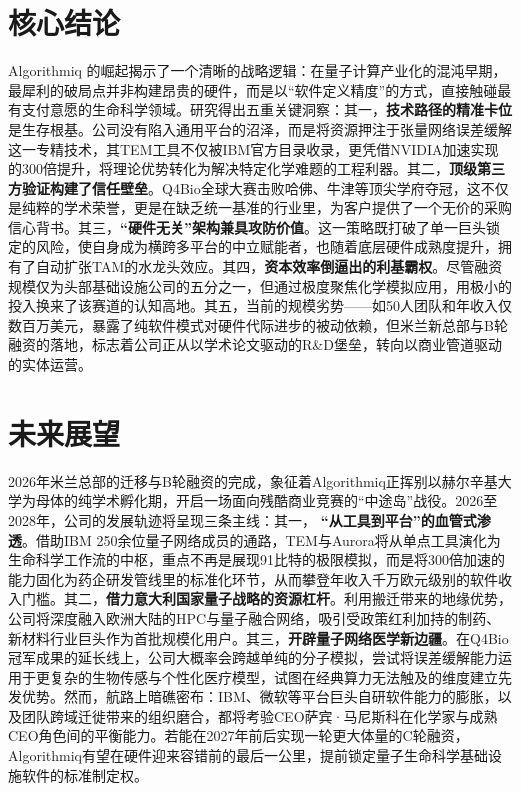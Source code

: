 \documentclass[11pt,a4paper]{ctexart}
\begin{document}
\section{核心结论}
Algorithmiq 的崛起揭示了一个清晰的战略逻辑：在量子计算产业化的混沌早期，最犀利的破局点并非构建昂贵的硬件，而是以“软件定义精度”的方式，直接触碰最有支付意愿的生命科学领域。研究得出五重关键洞察：其一，\textbf{技术路径的精准卡位}是生存根基。公司没有陷入通用平台的沼泽，而是将资源押注于张量网络误差缓解这一专精技术，其TEM工具不仅被IBM官方目录收录，更凭借NVIDIA加速实现的300倍提升，将理论优势转化为解决特定化学难题的工程利器。其二，\textbf{顶级第三方验证构建了信任壁垒}。Q4Bio全球大赛击败哈佛、牛津等顶尖学府夺冠，这不仅是纯粹的学术荣誉，更是在缺乏统一基准的行业里，为客户提供了一个无价的采购信心背书。其三，\textbf{“硬件无关”架构兼具攻防价值}。这一策略既打破了单一巨头锁定的风险，使自身成为横跨多平台的中立赋能者，也随着底层硬件成熟度提升，拥有了自动扩张TAM的水龙头效应。其四，\textbf{资本效率倒逼出的利基霸权}。尽管融资规模仅为头部基础设施公司的五分之一，但通过极度聚焦化学模拟应用，用极小的投入换来了该赛道的认知高地。其五，当前的规模劣势——如50人团队和年收入仅数百万美元，暴露了纯软件模式对硬件代际进步的被动依赖，但米兰新总部与B轮融资的落地，标志着公司正从以学术论文驱动的R\&D堡垒，转向以商业管道驱动的实体运营。

\section{未来展望}
2026年米兰总部的迁移与B轮融资的完成，象征着Algorithmiq正挥别以赫尔辛基大学为母体的纯学术孵化期，开启一场面向残酷商业竞赛的“中途岛”战役。2026至2028年，公司的发展轨迹将呈现三条主线：其一， \textbf{“从工具到平台”的血管式渗透}。借助IBM 250余位量子网络成员的通路，TEM与Aurora将从单点工具演化为生命科学工作流的中枢，重点不再是展现91比特的极限模拟，而是将300倍加速的能力固化为药企研发管线里的标准化环节，从而攀登年收入千万欧元级别的软件收入门槛。其二，\textbf{借力意大利国家量子战略的资源杠杆}。利用搬迁带来的地缘优势，公司将深度融入欧洲大陆的HPC与量子融合网络，吸引受政策红利加持的制药、新材料行业巨头作为首批规模化用户。其三，\textbf{开辟量子网络医学新边疆}。在Q4Bio冠军成果的延长线上，公司大概率会跨越单纯的分子模拟，尝试将误差缓解能力运用于更复杂的生物传感与个性化医疗模型，试图在经典算力无法触及的维度建立先发优势。然而，航路上暗礁密布：IBM、微软等平台巨头自研软件能力的膨胀，以及团队跨域迁徙带来的组织磨合，都将考验CEO萨宾·马尼斯科在化学家与成熟CEO角色间的平衡能力。若能在2027年前后实现一轮更大体量的C轮融资，Algorithmiq有望在硬件迎来容错前的最后一公里，提前锁定量子生命科学基础设施软件的标准制定权。
\end{document}
